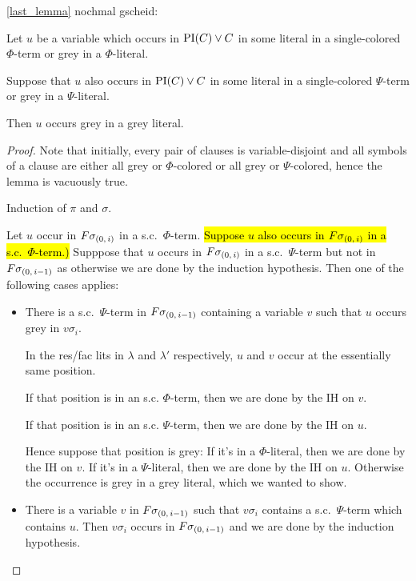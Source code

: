 \documentclass[,%
	draft=false,%
	numbers=noendperiod
	12pt,
	a4paper,
	oneside,%
	openany,
]{memoir}
\begin{document}
\begin{clemma}
	\ref{last_lemma} nochmal gscheid:

	Let $u$ be a variable which occurs in $\operatorname{PI}(C)\lor C$ in some literal in a single-colored $\Phi$-term or grey in a $\Phi$-literal.

	Suppose that $u$ also occurs in $\operatorname{PI}(C) \lor C$ in some literal in a single-colored $\Psi$-term or grey in a $\Psi$-literal.

	Then $u$ occurs grey in a grey literal.

\end{clemma}
\begin{proof}
	Note that initially, every pair of clauses is variable-disjoint and all symbols of a clause are either all grey or $\Phi$-colored or all grey or $\Psi$-colored, hence the lemma is vacuously true.

	Induction of $\pi$ and $\sigma$.

	Let $u$ occur in $F\sigma_{(0,\,i)}$ in a s.c.\ $\Phi$-term.
	\hl{Suppose $u$ also occurs in $F\sigma_{(0,\,i)}$ in a s.c.\ $\Phi$-term.)}
	Supppose that $u$ occurs in $F\sigma_{(0,\,i)}$ in a s.c.\ $\Psi$-term but not in $F\sigma_{(0,\,i-1)}$ as otherwise we are done by the induction hypothesis.
	Then one of the following cases applies:
	\begin{itemize}
		\item There is a s.c.\ $\Psi$-term in $F\sigma_{(0,\,i-1)}$ containing a variable $v$ such that $u$ occurs grey in $v\sigma_i$.
			
			In the res/fac lits in $\lambda$ and $\lambda'$ respectively, $u$ and $v$ occur at the essentially same position.

			If that position is in an s.c. $\Phi$-term, then we are done by the IH on $v$.

			If that position is in an s.c. $\Psi$-term, then we are done by the IH on $u$.

			Hence suppose that position is grey:
			If it's in a $\Phi$-literal, then we are done by the IH on $v$.
			If it's in a $\Psi$-literal, then we are done by the IH on $u$.
			Otherwise the occurrence is grey in a grey literal, which we wanted to show.
			

		\item There is a variable $v$ in $F\sigma_{(0,\,i-1)}$ such that $v\sigma_i$ contains a s.c.\ $\Psi$-term which contains $u$.
			Then $v\sigma_i$ occurs in $F\sigma_{(0,\,i-1)}$ and we are done by the induction hypothesis.
	\end{itemize}



	
	
\end{proof}
\end{document}
